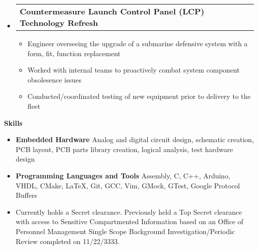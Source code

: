 \documentclass[letterpaper,12pt]{article}
\makeatletter
\def \entryspacing {-0pt}
\renewcommand{\section}[2]{\vspace{5pt}
  \colorbox{secondary}{\color{white}\raggedbottom\normalsize\textbf{{#1}{\hspace{7pt}#2}}}
}
\newcommand{\resumeEntryStart}{\begin{itemize}[leftmargin=2.5mm]}
\newcommand{\resumeEntryEnd}{\end{itemize}\vspace{\entryspacing}}
\newcommand{\resumeItemListStart}{\begin{itemize}[leftmargin=4.5mm]}
\newcommand{\resumeItemListEnd}{\end{itemize}}
\newcommand{\resumeItem}[1]{
  \item\small{
    {#1 \vspace{-2pt}}
  }
}
\newcommand{\resumeEntryTD}[2]{
  \vspace{-1pt}\item[]
    \begin{tabular*}{0.97\textwidth}{l@{\extracolsep{\fill}}r}
      \textbf{\color{primary}#1} & {\firabook\color{accent}\small#2} \\
    \end{tabular*}\vspace{-6pt}
}
\newcommand{\resumeEntryS}[2]{
  \item[]\small{
    \textbf{\color{primary}#1 }{ #2 \vspace{-6pt}}
  }
}
\newcommand{\resumeEntryNote}[1]{
  \item[]\small{
    { #1 \vspace{-6pt}}
  }
}
\makeatother
\begin{document}
  \resumeEntryStart
    \resumeEntryTD
      {Countermeasure Launch Control Panel (LCP) Technology Refresh}{}
    \resumeItemListStart
      \resumeItem
		{Engineer overseeing the upgrade of a submarine defensive system with a form, fit, function replacement}
	  \resumeItem {Worked with internal teams to proactively combat system component obsolesence issues}
	  \resumeItem {Conducted/coordinated testing of new equipment prior to delivery to the fleet}
    \resumeItemListEnd
  \resumeEntryEnd

\section{\faToolbox}{Skills}
 \resumeEntryStart
  \resumeEntryS
	{Embedded Hardware}
	{Analog and digital circuit design, schematic creation, PCB layout, PCB parts library creation, logical analysis, test hardware design}
  \resumeEntryS
	{Programming Languages and Tools}
	{Assembly, C, C++, Arduino, VHDL, CMake, \LaTeX, Git, GCC, Vim, GMock, GTest, Google Protocol Buffers}

  \resumeEntryNote
	{Currently holds a Secret clearance. Previously held a Top Secret clearance with access to Sensitive Compartmented Information based on an Office of Personnel Management Single Scope Background Investigation/Periodic Review completed on 11/22/3333.}
 \resumeEntryEnd
\end{document}
